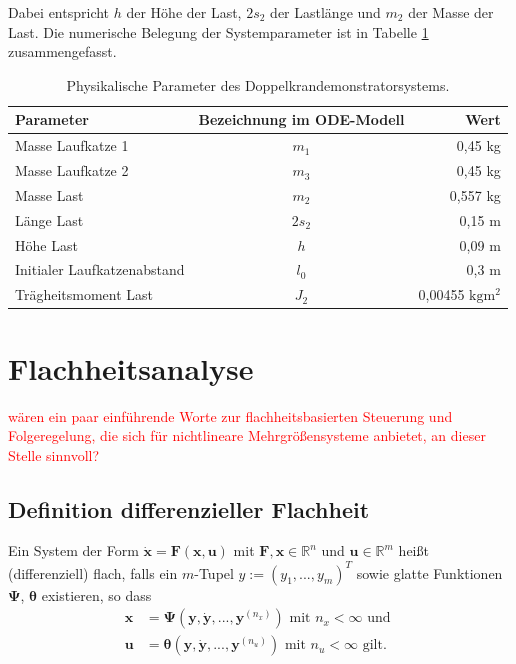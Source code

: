Dabei entspricht $h$ der Höhe der Last, $2 s_2$ der Lastlänge und $m_2$ der Masse der Last. Die numerische Belegung der Systemparameter ist in Tabelle \ref{tab:sys_params} zusammengefasst.

\begin{table}[htbp]%
	\centering
	\caption{Physikalische Parameter des Doppelkrandemonstratorsystems.}
	\label{tab:sys_params}
	\begin{tabular}{l c r} 
		\toprule
		Parameter & Bezeichnung im ODE-Modell & Wert \\ 
		\hline
		Masse Laufkatze 1 & $m_1$ & 0,45 \si{\kg} \\
		Masse Laufkatze 2 & $m_3$ & 0,45 \si{\kg} \\
 		Masse Last & $m_2$ & 0,557 \si{\kg} \\
		Länge Last & $2 s_2$ & 0,15 \si{\m} \\
		Höhe Last & $h$ & 0,09 \si{\m} \\
		Initialer Laufkatzenabstand & $l_0$ & 0,3 \si{\m} \\
		Trägheitsmoment Last & $J_2$ & 0,00455 $\si{\kg\m^2}$ \\
		\bottomrule
	\end{tabular}
\end{table}

\chapter{Flachheitsanalyse}
\textcolor{red}{wären ein paar einführende Worte zur flachheitsbasierten Steuerung und Folgeregelung, die sich für nichtlineare Mehrgrößensysteme anbietet, an dieser Stelle sinnvoll?}

\section{Definition differenzieller Flachheit}\label{sec:Def_flatness}

Ein System der Form $\dot{\mathbf{x}} = \mathbf{F}(\mathbf{x}, \mathbf{u})$ mit $\mathbf{F}, \mathbf{x} \in \mathbb{R}^n$ und $\mathbf{u} \in \mathbb{R}^m$ heißt (differenziell) flach, falls ein $m$-Tupel $y := (y_1, ..., y_m)^T$ sowie glatte Funktionen $\mathbf{\Psi}$, $\boldsymbol{\theta}$ existieren, so dass
\begin{align}
\mathbf{x} &= \mathbf{\Psi}(\mathbf{y}, \dot{\mathbf{y}}, ..., \mathbf{y}^{(n_x)}) \text{ mit } n_x < \infty \text{ und } \\
\mathbf{u} &= \boldsymbol{\theta}(\mathbf{y}, \dot{\mathbf{y}}, ..., \mathbf{y}^{(n_u)}) \text{ mit } n_u < \infty \text{ gilt.}
\end{align}

